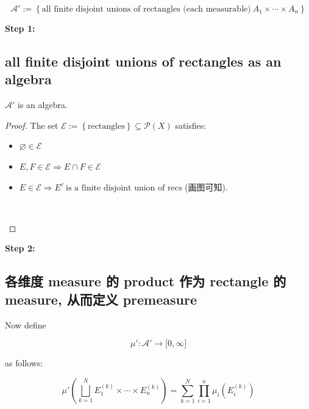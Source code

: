 \documentclass{qlnotes-export}
\begin{document}
\[\mathcal{A}' := \left\{ {\text{all finite disjoint unions of rectangles (each measurable)}\ A_{1} \times \cdots \times A_{n}} \right\}\]

\textbf{Step 1:}

\subsection{all finite disjoint unions of rectangles as an algebra}\label{all-finite-disjoint-unions-of-rectangles-as-an-algebra}

\begin{proposition}\label{prop-06-product-measure-fubini-tonelli-proposition-003}

\(\mathcal{A}'\) is an algebra.

\end{proposition}

\begin{proof}

The set \(\mathcal{E} := \left\{ \text{rectangles} \right\} \subseteq \mathcal{P}(X)\) satisfies:

\begin{itemize}
\item
  \(\varnothing \in \mathcal{E}\)
\item
  \(E,F \in \mathcal{E}\Longrightarrow E \cap F \in \mathcal{E}\)
\item
  \(E \in \mathcal{E}\Longrightarrow E^{c}\ \text{is a finite disjoint union of recs}\) (画图可知).\\
  \strut \\
\end{itemize}

\end{proof}

\textbf{Step 2:}

\subsection{各维度 measure 的 product 作为 rectangle 的 measure, 从而定义 premeasure}\label{ux5404ux7ef4ux5ea6-measure-ux7684-product-ux4f5cux4e3a-rectangle-ux7684-measure-ux4eceux800cux5b9aux4e49-premeasure}

Now define

\[\mu':\mathcal{A}'\rightarrow\lbrack 0,\infty\rbrack\]

as follows:

\[\mu'(\bigsqcup\limits_{k = 1}^{N}E_{1}^{(k)} \times \cdots \times E_{n}^{(k)}) = \sum\limits_{k = 1}^{N}\prod\limits_{i = 1}^{n}\mu_{i}(E_{i}^{(k)})\]
\end{document}
